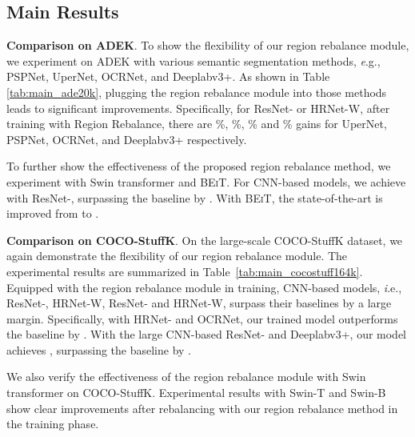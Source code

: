 \documentclass[final]{cvpr}
\begin{document}
\subsection{Main Results}

\vspace{1mm}
\noindent\textbf{Comparison on ADEK}.
To show the flexibility of our region rebalance module, we experiment on ADEK with various semantic segmentation methods, {\textit e.g.}, PSPNet, UperNet, OCRNet, and Deeplabv3+. As shown in Table \ref{tab:main_ade20k}, plugging the region rebalance module into those methods leads to significant improvements. Specifically, for ResNet- or HRNet-W, after training with Region Rebalance, there are \%, \%, \% and \% gains for UperNet, PSPNet, OCRNet, and Deeplabv3+ respectively.


To further show the effectiveness of the proposed region rebalance method, we experiment with Swin transformer and \textsc{BEiT}. For CNN-based models, we achieve   with ResNet-, surpassing the baseline by . With \textsc{BEiT}, the state-of-the-art is improved from   to  .

\vspace{1mm}
\noindent\textbf{Comparison on COCO-StuffK}.
On the large-scale COCO-StuffK dataset, we again demonstrate the flexibility of our region rebalance module. The experimental results are summarized in Table~\ref{tab:main_cocostuff164k}.
Equipped with the region rebalance module in training, CNN-based models, {\textit i.e.}, ResNet-, HRNet-W, ResNet- and HRNet-W, surpass their baselines by a large margin. Specifically, with HRNet- and OCRNet, our trained model outperforms the baseline by  . With the large CNN-based ResNet- and Deeplabv3+, our model achieves  , surpassing the baseline by  . 

We also verify the effectiveness of the region rebalance module with Swin transformer on COCO-StuffK. Experimental results with Swin-T and Swin-B show clear improvements after rebalancing with our region rebalance method in the training phase. 
\end{document}
